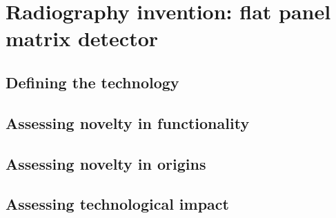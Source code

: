 \section{Radiography invention: flat panel matrix detector}
\subsection{Defining the technology}

\subsection{Assessing novelty in functionality}

\subsection{Assessing novelty in origins}

\subsection{Assessing technological impact}
